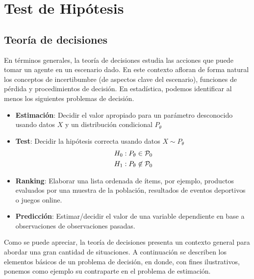 

\chapter{Test de Hipótesis}


\section{Teoría de decisiones}
\label{sec:teoría_de_decisiones}

En términos generales, la teoría de decisiones estudia las acciones que puede tomar un agente en un escenario dado. En este contexto afloran de forma natural los conceptos de incertibumbre (de aspectos clave del escenario), funciones de pérdida y procedimientos de decisión. En estadística, podemos identificar al menos los siguientes problemas de decisión.


\begin{itemize}
	\item \textbf{Estimación}: Decidir el valor apropiado para un parámetro desconocido usando datos $X$ y un distribución condicional $P_\theta$
	\item \textbf{Test}: Decidir la hipótesis correcta usando datos $X\sim P_\theta$
	\begin{align}
		H_0: P_\theta\in{\mathcal P}_0\\
		H_1: P_\theta\not\in{\mathcal P}_0
	\end{align}
	\item \textbf{Ranking}: Elaborar una lista ordenada de ítems, por ejemplo, productos evaluados por una muestra de la población, resultados de eventos deportivos o juegos online. 
	\item \textbf{Predicción}: Estimar/decidir el valor de una variable dependiente en base a observaciones de observaciones pasadas. 
\end{itemize}

Como se puede apreciar, la teoría de decisiones presenta un contexto general para abordar una gran cantidad de situaciones. A continuación se describen los elementos básicos de un problema de decisión, en donde, con fines ilustrativos, ponemos como ejemplo su contraparte en el problema de estimación.

